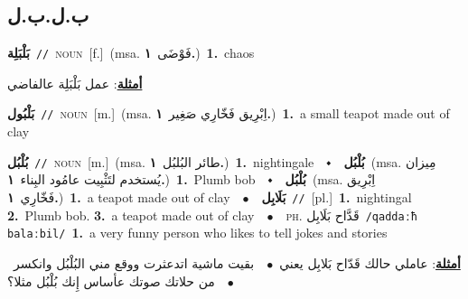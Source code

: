 \documentclass[10pt,a4paper,twoside]{article} %
\begin{document}
\begin{multicols}{2}
\vspace{-3mm}
\subsection*{\color{blue}\foreignlanguage{arabic}{ب.ل.ب.ل}\color{blue}{}} 

{\setlength\topsep{0pt}\textbf{\foreignlanguage{arabic}{بَلْبَلِة}}\ {\color{gray}\texttt{//}\color{black}}\ \textsc{noun}\ [f.]\ \color{gray}(msa. \foreignlanguage{arabic}{فَوْضَى}~\foreignlanguage{arabic}{\textbf{١.}})\color{black}\ \textbf{1.}~chaos\  \begin{flushright}\color{gray}\foreignlanguage{arabic}{\textbf{\underline{\foreignlanguage{arabic}{أمثلة}}}: عمل بَلْبَلِة عالفاضي}\end{flushright}\color{black}} \vspace{2mm}

{\setlength\topsep{0pt}\textbf{\foreignlanguage{arabic}{بَلْبُول}}\ {\color{gray}\texttt{//}\color{black}}\ \textsc{noun}\ [m.]\ \color{gray}(msa. \foreignlanguage{arabic}{اِبْرِيق فَخّارِي صَغِير}~\foreignlanguage{arabic}{\textbf{١.}})\color{black}\ \textbf{1.}~a small teapot made out of clay\ } \vspace{2mm}

{\setlength\topsep{0pt}\textbf{\foreignlanguage{arabic}{بُلْبُل}}\ {\color{gray}\texttt{//}\color{black}}\ \textsc{noun}\ [m.]\ \color{gray}(msa. \foreignlanguage{arabic}{طائر البُلبُل}~\foreignlanguage{arabic}{\textbf{١.}})\color{black}\ \textbf{1.}~nightingale\ \ $\smblkdiamond$\ \ \setlength\topsep{0pt}\textbf{\foreignlanguage{arabic}{بُلْبُل}}\ \color{gray}(msa. \foreignlanguage{arabic}{مِيزان يُستخدم لتَثْبِيت عامُود البِناء}~\foreignlanguage{arabic}{\textbf{١.}})\color{black}\ \textbf{1.}~Plumb bob\ \ $\smblkdiamond$\ \ \setlength\topsep{0pt}\textbf{\foreignlanguage{arabic}{بُلْبُل}}\ \color{gray}(msa. \foreignlanguage{arabic}{اِبْرِيق فَخّارِي}~\foreignlanguage{arabic}{\textbf{١.}})\color{black}\ \textbf{1.}~a teapot made out of clay\ \ $\bullet$\ \ \setlength\topsep{0pt}\textbf{\foreignlanguage{arabic}{بَلَابِل}}\ {\color{gray}\texttt{//}\color{black}}\ [pl.]\ \textbf{1.}~nightingal  \textbf{2.}~Plumb bob.  \textbf{3.}~a teapot made out of clay\ \ $\bullet$\ \ \textsc{ph.} \color{gray} \foreignlanguage{arabic}{قَدَّاح بَلَابِل}\color{black}\ {\color{gray}\texttt{/{\sffamily qaddaːħ balaːbil}/}\color{black}}\ \textbf{1.}~a very funny person who likes to tell jokes and stories\  \begin{flushright}\color{gray}\foreignlanguage{arabic}{\textbf{\underline{\foreignlanguage{arabic}{أمثلة}}}: عاملي حالك قَدّاح بَلابِل يعني\ $\bullet$\ \  بقيت ماشية اتدعثرت ووقع مني البُلْبُل وانكسر\ $\bullet$\ \  من حلاتك صوتك عأساس إِنك بُلْبُل مثلا؟}\end{flushright}\color{black}} \vspace{2mm}


\end{multicols}
\end{document}
